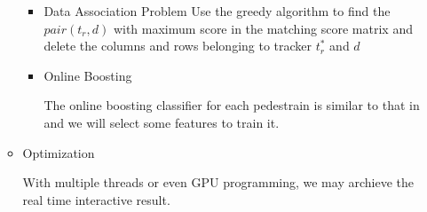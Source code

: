\documentclass[a4paper]{article}
\begin{document}
\begin{enumerate}
\begin{itemize}
\begin{itemize}

\item Data Association Problem
Use the greedy algorithm to find the $pair(t_r,d)$ with maximum score in the matching score matrix and delete the columns and rows belonging to tracker $t_r^*$ and $d$ 

\item Online Boosting

The online boosting classifier for each pedestrain is similar to that in \cite{Grabner:2006:OBV:1153170.1153451} and we will select some features to train it.

\end{itemize}

\item Optimization

With multiple threads or even GPU programming, we may archieve the real time interactive result.


\end{itemize}

\end{enumerate}

\clearpage


\end{document}

